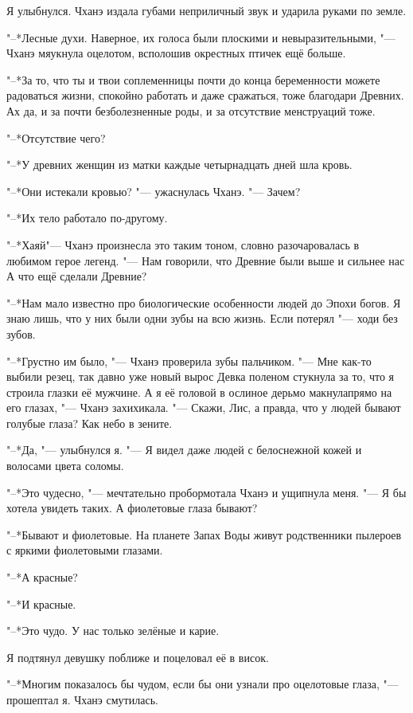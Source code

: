 Я улыбнулся.
Чханэ издала губами неприличный звук и ударила руками по земле.

"--*Лесные духи.
Наверное, их голоса были плоскими и невыразительными, "--- Чханэ мяукнула оцелотом, всполошив окрестных птичек ещё больше.

"--*За то, что ты и твои соплеменницы почти до конца беременности можете радоваться жизни, спокойно работать и даже сражаться, тоже благодари Древних.
Ах да, и за почти безболезненные роды, и за отсутствие менструаций тоже.

"--*Отсутствие чего?

"--*У древних женщин из матки каждые четырнадцать дней шла кровь.

"--*Они истекали кровью? "--- ужаснулась Чханэ.
"--- Зачем?

"--*Их тело работало по-другому.

"--*Хаяй\ldotst "--- Чханэ произнесла это таким тоном, словно разочаровалась в любимом герое легенд.
"--- Нам говорили, что Древние были выше и сильнее нас\ldotst
А что ещё сделали Древние?

"--*Нам мало известно про биологические особенности людей до Эпохи богов.
Я знаю лишь, что у них были одни зубы на всю жизнь.
Если потерял "--- ходи без зубов.

"--*Грустно им было, "--- Чханэ проверила зубы пальчиком.
"--- Мне как-то выбили резец, так давно уже новый вырос\ldotst
Девка поленом стукнула за то, что я строила глазки её мужчине.
А я её головой в ослиное дерьмо макнула\ldotst прямо на его глазах, "--- Чханэ захихикала.
"--- Скажи, Лис, а правда, что у людей бывают голубые глаза?
Как небо в зените.

"--*Да, "--- улыбнулся я.
"--- Я видел даже людей с белоснежной кожей и волосами цвета соломы.

"--*Это чудесно, "--- мечтательно пробормотала Чханэ и ущипнула меня.
"--- Я бы хотела увидеть таких.
А фиолетовые глаза бывают?

"--*Бывают и фиолетовые.
На планете Запах Воды живут родственники пылероев с яркими фиолетовыми глазами.

"--*А красные?

"--*И красные.

"--*Это чудо.
У нас только зелёные и карие.

Я подтянул девушку поближе и поцеловал её в висок.

"--*Многим показалось бы чудом, если бы они узнали про оцелотовые глаза, "--- прошептал я.
Чханэ смутилась.

